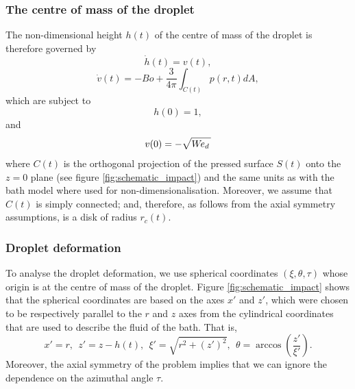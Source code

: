 \documentclass{jfm}
\newcommand{\Wed}{W\kern-0.15em e _d\,}
\begin{document}
\subsubsection{The centre of mass of the droplet}
The non-dimensional height $h(t)$ of the centre of mass of the droplet is therefore governed by
\begin{equation}\label{eqn:vel_cm}
    \dot{h}(t) = v(t),
\end{equation}
\begin{equation}
    \label{eqn:centerofmass_drop}
    \dot{v}(t) = -Bo + \frac{3}{4\pi } \int_{C(t)} p(r,t) dA,
\end{equation}
which are subject to
\begin{equation}
    h(0) = 1,
\end{equation}
and 
\begin{equation}
    v(0) = -\sqrt{\Wed}
\end{equation}
where $C(t)$ is the orthogonal projection of the pressed surface $S(t)$ onto the $z = 0$ plane (see figure \ref{fig:schematic_impact})
and the same units as with the bath model where used for non-dimensionalisation. Moreover, we assume that $C(t)$ is simply connected; and, therefore, as follows from the axial symmetry assumptions, is a disk of radius $r_c(t)$.

\subsubsection{Droplet deformation}
To analyse the droplet deformation, we use spherical coordinates $(\xi,\theta,\tau)$ whose origin is at the centre of mass of the droplet. Figure \ref{fig:schematic_impact} shows that the spherical coordinates are based on the axes $x'$ and $z'$, which were chosen to be respectively parallel to the $r$ and $z$ axes from the cylindrical coordinates that are used to describe the fluid of the bath. That is,
\begin{equation}
    x' = r,\ \  z' = z-h(t),\ \ \xi' = \sqrt{
    r^2+\left(z'\right)^2},\ \ \theta = \arccos\left(\frac{z'}{\xi'}\right).
\end{equation}
Moreover, the axial symmetry of the problem implies that we can ignore the dependence on the azimuthal angle $\tau$.
\end{document}
